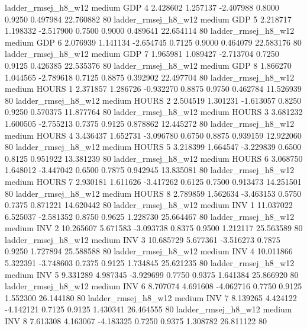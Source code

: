    ladder_rmsej_h8_w12     medium      GDP                 4  2.428602 1.257137 -2.407988 0.8000 0.9250  0.497984   22.760882 80
   ladder_rmsej_h8_w12     medium      GDP                 5  2.218717 1.198332 -2.517900 0.7500 0.9000  0.489641   22.654114 80
   ladder_rmsej_h8_w12     medium      GDP                 6  2.076939 1.141134 -2.654745 0.7125 0.9000  0.464079   22.583176 80
   ladder_rmsej_h8_w12     medium      GDP                 7  1.965981 1.089427 -2.713704 0.7250 0.9125  0.426385   22.535376 80
   ladder_rmsej_h8_w12     medium      GDP                 8  1.866270 1.044565 -2.789618 0.7125 0.8875  0.392902   22.497704 80
   ladder_rmsej_h8_w12     medium    HOURS                 1  2.371857 1.286726 -0.932270 0.8875 0.9750  0.462784   11.526939 80
   ladder_rmsej_h8_w12     medium    HOURS                 2  2.504519 1.301231 -1.613057 0.8250 0.9250  0.570375   11.877764 80
   ladder_rmsej_h8_w12     medium    HOURS                 3  3.681232 1.600505 -2.755213 0.7375 0.9125  0.878862   12.445272 80
   ladder_rmsej_h8_w12     medium    HOURS                 4  3.436437 1.652731 -3.096780 0.6750 0.8875  0.939159   12.922060 80
   ladder_rmsej_h8_w12     medium    HOURS                 5  3.218399 1.664547 -3.229839 0.6500 0.8125  0.951922   13.381239 80
   ladder_rmsej_h8_w12     medium    HOURS                 6  3.068750 1.648012 -3.447042 0.6500 0.7875  0.942945   13.835081 80
   ladder_rmsej_h8_w12     medium    HOURS                 7  2.930181 1.611626 -3.417262 0.6125 0.7500  0.913473   14.251501 80
   ladder_rmsej_h8_w12     medium    HOURS                 8  2.789859 1.562634 -3.463153 0.5750 0.7375  0.871221   14.620442 80
   ladder_rmsej_h8_w12     medium      INV                 1 11.037022 6.525037 -2.581352 0.8750 0.9625  1.228730   25.664467 80
   ladder_rmsej_h8_w12     medium      INV                 2 10.265607 5.671583 -3.093738 0.8375 0.9500  1.212117   25.563589 80
   ladder_rmsej_h8_w12     medium      INV                 3 10.685729 5.677361 -3.516273 0.7875 0.9250  1.727894   25.588588 80
   ladder_rmsej_h8_w12     medium      INV                 4 10.011866 5.322391 -3.748603 0.7375 0.9125  1.734845   25.621235 80
   ladder_rmsej_h8_w12     medium      INV                 5  9.331289 4.987345 -3.929699 0.7750 0.9375  1.641384   25.866920 80
   ladder_rmsej_h8_w12     medium      INV                 6  8.707074 4.691608 -4.062716 0.7750 0.9125  1.552300   26.144180 80
   ladder_rmsej_h8_w12     medium      INV                 7  8.139265 4.424122 -4.142121 0.7125 0.9125  1.430341   26.464555 80
   ladder_rmsej_h8_w12     medium      INV                 8  7.613308 4.163067 -4.183325 0.7250 0.9375  1.308782   26.811122 80

